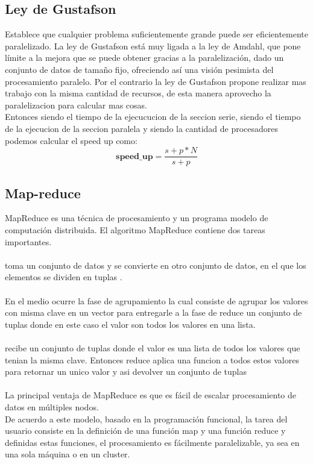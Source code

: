 \subsection{Ley de Gustafson}

Establece que cualquier problema suficientemente grande puede ser eficientemente
paralelizado. La ley de Gustafson está muy ligada a la ley de Amdahl, que pone
límite a la mejora que se puede obtener gracias a la paralelización, dado un
conjunto de datos de tamaño fijo, ofreciendo así una visión pesimista del
procesamiento paralelo. Por el contrario la ley de Gustafson  propone realizar
mas trabajo con la misma cantidad de recursos, de esta manera aprovecho la
paralelizacion para calcular mas cosas.\\

Entonces siendo  el tiempo de la ejecucucion de la seccion serie, siendo
 el tiempo de la ejecucion de la seccion paralela y siendo  la
cantidad de procesadores podemos calcular el speed up como:
\begin{equation}
    \textbf{speed\_up} = \dfrac{s+p*N}{s+p}
\end{equation}

\subsection{Map-reduce}

MapReduce es una técnica de procesamiento y un programa modelo de computación
distribuida. El algoritmo MapReduce contiene dos tareas importantes.\\\\
 toma un conjunto de datos y se convierte en otro conjunto de datos, en el
que los elementos se dividen en tuplas .\\\\
En el medio ocurre la fase de agrupamiento la cual consiste de agrupar los valores
con misma clave en un vector para entregarle a la fase de reduce un conjunto de
tuplas  donde en este caso el valor son todos los valores
en una lista.\\\\
 recibe un conjunto de tuplas  donde el valor
es una lista de todos los valores que tenian la misma clave. Entonces reduce
aplica una funcion a todos estos valores para retornar un unico valor y asi
devolver un conjunto de tuplas \\\\
La principal ventaja de MapReduce es que es fácil de escalar procesamiento de
datos en múltiples nodos.\\
De acuerdo a este modelo, basado en la programación funcional, la tarea del
usuario consiste en la definición de una función map y una función reduce y
definidas estas funciones, el procesamiento es fácilmente paralelizable, ya sea
en una sola máquina o en un cluster.\\
